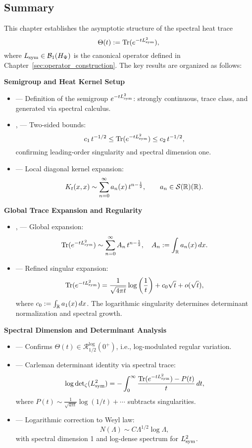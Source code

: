 \subsection*{Summary}

This chapter establishes the asymptotic structure of the spectral heat trace
\[
\Theta(t) := \operatorname{Tr}(e^{-t L_{\mathrm{sym}}^2}),
\]
where \( L_{\mathrm{sym}} \in \mathcal{B}_1(H_{\Psi}) \) is the canonical operator defined in Chapter~\ref{sec:operator_construction}. The key results are organized as follows:

\textbf{Semigroup and Heat Kernel Setup}
\begin{itemize}
  \item {} — Definition of the semigroup \( e^{-t L_{\mathrm{sym}}^2} \): strongly continuous, trace class, and generated via spectral calculus.
  \item {},  — Two-sided bounds:
  \[
  c_1\, t^{-1/2} \leq \operatorname{Tr}(e^{-t L_{\mathrm{sym}}^2}) \leq c_2\, t^{-1/2},
  \]
  confirming leading-order singularity and spectral dimension one.
  \item {} — Local diagonal kernel expansion:
  \[
  K_t(x,x) \sim \sum_{n=0}^\infty a_n(x) \, t^{n - \frac{1}{2}}, \qquad a_n \in \mathcal{S}(\mathbb{R})(\mathbb{R}).
  \]
\end{itemize}

\textbf{Global Trace Expansion and Regularity}
\begin{itemize}
  \item {},  — Global expansion:
  \[
  \operatorname{Tr}(e^{-t L_{\mathrm{sym}}^2}) \sim \sum_{n=0}^\infty A_n \, t^{n - \frac{1}{2}}, \quad A_n := \int_{\mathbb{R}} a_n(x) \, dx.
  \]
  \item {} — Refined singular expansion:
  \[
  \operatorname{Tr}(e^{-t L_{\mathrm{sym}}^2}) = \frac{1}{\sqrt{4\pi t}} \log\left(\frac{1}{t}\right) + c_0 \sqrt{t} + o(\sqrt{t}),
  \]
  where \( c_0 := \int_{\mathbb{R}} a_1(x)\, dx \). The logarithmic singularity determines determinant normalization and spectral growth.
\end{itemize}

\textbf{Spectral Dimension and Determinant Analysis}
\begin{itemize}
  \item {} — Confirms \( \Theta(t) \in \mathcal{R}_{1/2}^{\log}(0^+) \), i.e., log-modulated regular variation.
  \item {} — Carleman determinant identity via spectral trace:
  \[
  \log \det\nolimits_{\zeta}(L_{\mathrm{sym}}^2) = -\int_0^\infty \frac{\operatorname{Tr}(e^{-t L_{\mathrm{sym}}^2}) - P(t)}{t} \, dt,
  \]
  where \( P(t) \sim \frac{1}{\sqrt{4\pi t}} \log(1/t) + \cdots \) subtracts singularities.
  \item {} — Logarithmic correction to Weyl law:
  \[
  N(\Lambda) \sim C \Lambda^{1/2} \log \Lambda,
  \]
  with spectral dimension 1 and log-dense spectrum for \( L_{\mathrm{sym}}^2 \).
\end{itemize}

